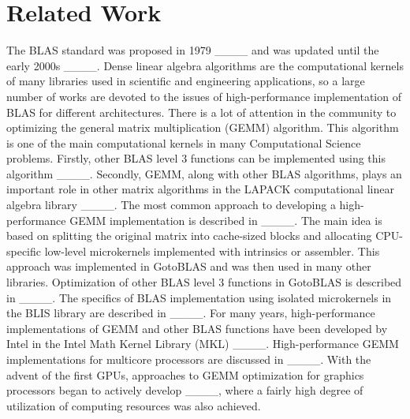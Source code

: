 \section{Related Work}
\label{sec2}

The BLAS standard was proposed in 1979 ____ and was updated until the early 2000s
____. Dense linear algebra algorithms are the computational kernels of many libraries used in scientific and engineering applications, so a large number of works are devoted to the issues of high-performance implementation of BLAS for different architectures. There is a lot of attention in the community to optimizing the general matrix multiplication (GEMM) algorithm. This algorithm is one of the main computational kernels in many Computational Science problems. Firstly, other BLAS level 3 functions can be implemented using this algorithm ____. Secondly, GEMM, along with other BLAS algorithms, plays an important role in other matrix algorithms in the LAPACK computational linear algebra library ____. The most common approach to developing a high-performance GEMM implementation is described in ____. The main idea is based on splitting the original matrix into cache-sized blocks and allocating CPU-specific low-level microkernels implemented with intrinsics or assembler. This approach was implemented in GotoBLAS and was then used in many other libraries. Optimization of other BLAS level 3 functions in GotoBLAS is described in ____. The specifics of BLAS implementation using isolated microkernels in the BLIS library are described in ____. For many years, high-performance implementations of GEMM and other BLAS functions have been developed by Intel in the Intel Math Kernel Library (MKL) ____. High-performance GEMM implementations for multicore processors are discussed in ____. With the advent of the first GPUs, approaches to GEMM optimization for graphics processors began to actively develop ____, where a fairly high degree of utilization of computing resources was also achieved. 


